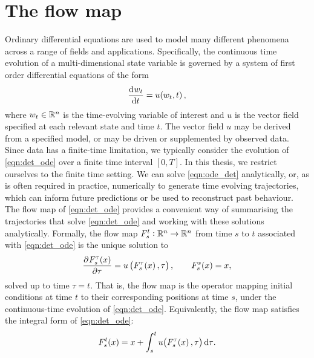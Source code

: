 \section{The flow map}
Ordinary differential equations are used to model many different phenomena across a range of fields and applications.
Specifically, the continuous time evolution of a multi-dimensional state variable is governed by a system of first order differential equations of the form
\begin{equation}\label{eqn:det_ode}
	\dod{w_t}{t} = u\!\left(w_t, t\right),
\end{equation}
where \(w_t \in \mathbb{R}^n\) is the time-evolving variable of interest and \(u\) is the vector field specified at each relevant state and time \(t\).
The vector field \(u\) may be derived from a specified model, or may be driven or supplemented by observed data.
Since data has a finite-time limitation, we typically consider the evolution of \cref{eqn:det_ode} over a finite time interval \([0,T]\).
In this thesis, we restrict ourselves to the finite time setting.
We can solve \cref{eqn:ode_det} analytically, or, as is often required in practice, numerically to generate time evolving trajectories, which can inform future predictions or be used to reconstruct past behaviour.
The flow map of \cref{eqn:det_ode} provides a convenient way of summarising the trajectories that solve \cref{eqn:det_ode} and working with these solutions analytically.
Formally, the flow map \(F_{s}^{t}: \mathbb{R}^n \to \mathbb{R}^n\) from time \(s\) to \(t\) associated with \cref{eqn:det_ode} is the unique solution to
\begin{equation}
	\dpd{F_{s}^{\tau}\!\left(x\right)}{\tau} = u\left(F_{s}^\tau\!\left(x\right), \tau\right), \qquad F_{s}^{s}\!\left(x\right) = x,
	\label{eqn:flow_map_ode}
\end{equation}
solved up to time \(\tau = t\).
That is, the flow map is the operator mapping initial conditions at time \(t\) to their corresponding positions at time \(s\), under the continuous-time evolution of \cref{eqn:det_ode}.
Equivalently, the flow map satisfies the integral form of \cref{eqn:det_ode}:
\begin{equation}\label{eqn:flow_map_int}
	F_s^t\!\left(x\right) = x + \int_s^t{u\!\left(F_s^{\tau}\!\left(x\right), \tau\right)\dif \tau}.
\end{equation}
